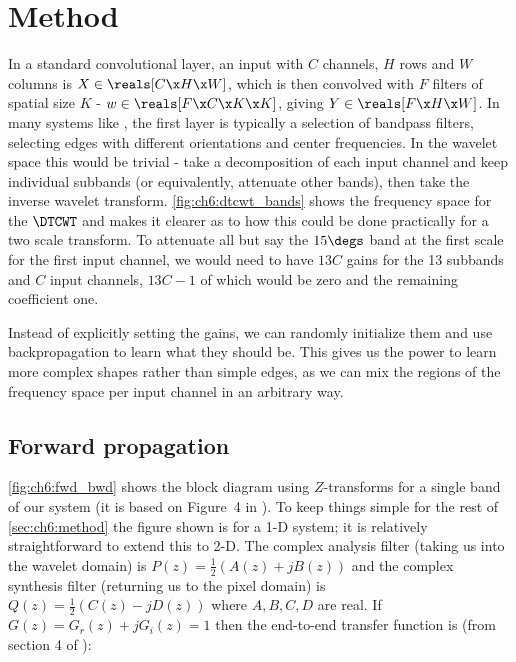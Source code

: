 \section{Method}\label{sec:ch6:method}



In a standard convolutional layer, an input with $C$ channels, $H$ rows and $W$
columns is $X \in \reals[C\x H\x W]$, which is then convolved with $F$ filters
of spatial size $K$ - $w \in \reals[F \x C\x K\x K]$, giving $Y \in \reals[F\x
H\x W]$. In many systems like \cite{krizhevsky_imagenet_2012, he_deep_2015}, the
first layer is typically a selection of bandpass filters, selecting edges with
different orientations and center frequencies. In the wavelet space this would
be trivial - take a decomposition of each input channel and keep individual
subbands (or equivalently, attenuate other bands), then take the inverse wavelet
transform.  \autoref{fig:ch6:dtcwt_bands} shows the frequency space for the
$\DTCWT$ and makes it clearer as to how this could be done practically for a two
scale transform. To attenuate all but say the $15 \degs$ band at the first scale
for the first input channel, we would need to have $13C$ gains for the 13
subbands and $C$ input channels, $13C-1$ of which would be zero and the
remaining coefficient one.

Instead of explicitly setting the gains, we can randomly initialize them and use
backpropagation to learn what they should be. This gives us the power to learn
more complex shapes rather than simple edges, as we can mix the regions of the
frequency space per input channel in an arbitrary way. 

\subsection{Forward propagation}
\autoref{fig:ch6:fwd_bwd} shows the block diagram using $Z$-transforms for
a single band of our system (it is based on Figure~4 in
\cite{kingsbury_complex_2001}). To keep things simple for the rest of
\autoref{sec:ch6:method} the figure shown is for a 1-D system; it is relatively
straightforward to extend this to 2-D\cite{selesnick_dual-tree_2005}. The
complex analysis filter (taking us into the wavelet domain) is $P(z)
= \frac{1}{2}\left(A(z)+jB(z)\right)$ and the complex synthesis filter
(returning us to the pixel domain) is $Q(z) = \frac{1}{2}\left(C(z)
  - jD(z)\right)$ where $A,B,C,D$ are real.  If $G(z) = G_r(z) + jG_i(z) = 1$
  then the end-to-end transfer function is (from section 4 of
\cite{kingsbury_complex_2001}):

